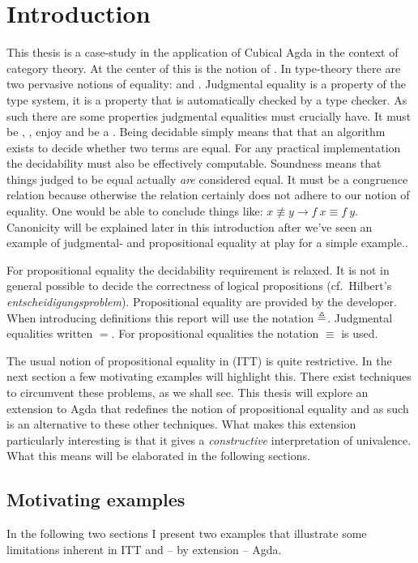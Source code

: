 \chapter{Introduction}
This thesis is a case-study in the application of Cubical Agda in the
context of category theory. At the center of this is the notion of
. In type-theory there are two pervasive notions
of equality:  and
. Judgmental equality is a property
of the type system, it is a property that is automatically checked by
a type checker. As such there are some properties judgmental
equalities must crucially have. It must be ,
, enjoy  and be a
. Being decidable simply means that that an
algorithm exists to decide whether two terms are equal. For any
practical implementation the decidability must also be effectively
computable. Soundness means that things judged to be equal actually
\emph{are} considered equal. It must be a congruence relation because
otherwise the relation certainly does not adhere to our notion of
equality. One would be able to conclude things like: $x \nequiv y
\rightarrow f\ x \equiv f\ y$. Canonicity will be explained later in
this introduction after we've seen an example of judgmental- and
propositional equality at play for a simple example..

For propositional equality the decidability requirement is relaxed. It
is not in general possible to decide the correctness of logical
propositions (cf.\ Hilbert's \emph{entscheidigungsproblem}).
Propositional equality are provided by the developer. When introducing
definitions this report will use the notation $\mathrel{\triangleq}$. Judgmental
equalities written $=$. For propositional equalities the notation
$\equiv$ is used.

The usual notion of propositional equality in  (ITT) is quite restrictive. In the next section a few
motivating examples will highlight this. There exist techniques to
circumvent these problems, as we shall see. This thesis will explore
an extension to Agda that redefines the notion of propositional
equality and as such is an alternative to these other techniques. What
makes this extension particularly interesting is that it gives a
\emph{constructive} interpretation of univalence. What this means will
be elaborated in the following sections.
%
\section{Motivating examples}
%
In the following two sections I present two examples that illustrate
some limitations inherent in ITT and -- by extension -- Agda.
%
